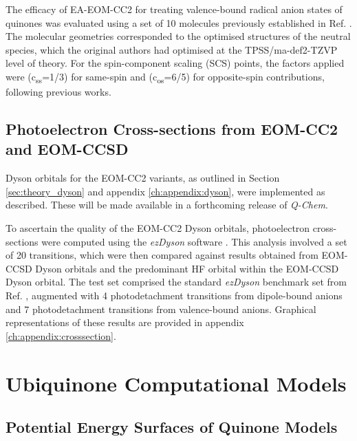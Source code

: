 The efficacy of EA-EOM-CC2 for treating valence-bound radical anion states of quinones was evaluated using a set of 10 molecules previously established in Ref. .
The molecular geometries corresponded to the optimised structures of the neutral species, which the original authors had optimised at the TPSS/ma-def2-TZVP level of theory. For the spin-component scaling (SCS) points, the factors applied were (c\textsubscript{ss}=1/3) for same-spin and (c\textsubscript{os}=6/5) for opposite-spin contributions, following previous works\cite{grimme2003improved,paran2024performance,shaalan2022accurate}.\\

\subsection{Photoelectron Cross-sections from EOM-CC2 and EOM-CCSD}

Dyson orbitals for the EOM-CC2 variants, as outlined in Section \ref{sec:theory_dyson} and appendix \ref{ch:appendix:dyson}, were implemented as described. These will be made available in a forthcoming release of \textit{Q-Chem}.

To ascertain the quality of the EOM-CC2 Dyson orbitals, photoelectron cross-sections were computed using the \textit{ezDyson} software \cite{gozem2022ezspectra,gozem2015photoionization}. This analysis involved a set of 20 transitions, which were then compared against results obtained from EOM-CCSD Dyson orbitals and the predominant HF orbital within the EOM-CCSD Dyson orbital. The test set comprised the standard \textit{ezDyson} benchmark set from Ref. , augmented with 4 photodetachment transitions from dipole-bound anions and 7 photodetachment transitions from valence-bound anions. Graphical representations of these results are provided in appendix \ref{ch:appendix:crosssection}.\\

\section{Ubiquinone Computational Models}

\subsection{Potential Energy Surfaces of Quinone Models}


